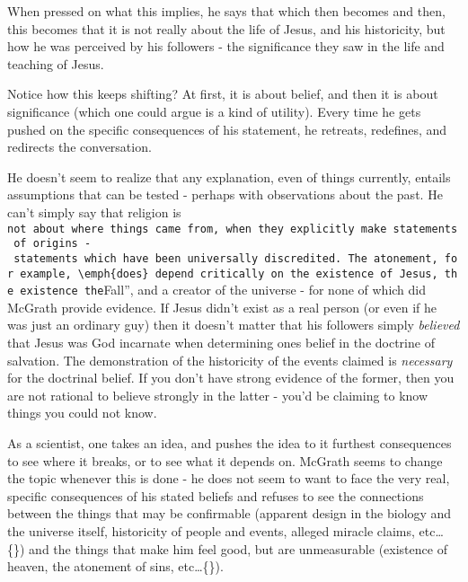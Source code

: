 \documentclass{tufte-book}
\begin{document}

When pressed on what this implies, he says that  which then becomes
 and then, this becomes that it is not really about the life of Jesus,
and his historicity, but how he was perceived by his followers - the
significance they saw in the life and teaching of Jesus.

Notice how this keeps shifting? At first, it is about belief, and then
it is about significance (which one could argue is a kind of utility).
Every time he gets pushed on the specific consequences of his statement,
he retreats, redefines, and redirects the conversation.

He doesn't seem to realize that any explanation, even of things
currently, entails assumptions that can be tested - perhaps with
observations about the past. He can't simply say that religion is
\texttt{not\ about\ where\ things\ came\ from\textquotesingle{}\textquotesingle{},\ when\ they\ explicitly\ make\ statements\ of\ origins\ -\ statements\ which\ have\ been\ universally\ discredited.\ The\ atonement,\ for\ example,\ \textbackslash{}emph\{does\}\ depend\ critically\ on\ the\ existence\ of\ Jesus,\ the\ existence\ the}Fall'',
and a creator of the universe - for none of which did McGrath provide
evidence. If Jesus didn't exist as a real person (or even if he was just
an ordinary guy) then it doesn't matter that his followers simply
\emph{believed} that Jesus was God incarnate when determining ones
belief in the doctrine of salvation. The demonstration of the
historicity of the events claimed is \emph{necessary} for the doctrinal
belief. If you don't have strong evidence of the former, then you are
not rational to believe strongly in the latter - you'd be claiming to
know things you could not know.

As a scientist, one takes an idea, and pushes the idea to it furthest
consequences to see where it breaks, or to see what it depends on.
McGrath seems to change the topic whenever this is done - he does not
seem to want to face the very real, specific consequences of his stated
beliefs and refuses to see the connections between the things that may
be confirmable (apparent design in the biology and the universe itself,
historicity of people and events, alleged miracle claims, etc\ldots\{\})
and the things that make him feel good, but are unmeasurable (existence
of heaven, the atonement of sins, etc\ldots\{\}).
\end{document}
